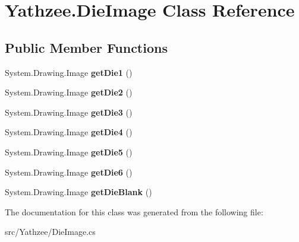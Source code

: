 \hypertarget{class_yathzee_1_1_die_image}{}\section{Yathzee.\+Die\+Image Class Reference}
\label{class_yathzee_1_1_die_image}
\subsection*{Public Member Functions}
\begin{DoxyCompactItemize}
\item 
System.\+Drawing.\+Image {\bfseries get\+Die1} ()\hypertarget{class_yathzee_1_1_die_image_a2724ca8f7897a55ffe997ef924394c7e}{}\label{class_yathzee_1_1_die_image_a2724ca8f7897a55ffe997ef924394c7e}

\item 
System.\+Drawing.\+Image {\bfseries get\+Die2} ()\hypertarget{class_yathzee_1_1_die_image_a263559c79673dcfaaed6e32611c52804}{}\label{class_yathzee_1_1_die_image_a263559c79673dcfaaed6e32611c52804}

\item 
System.\+Drawing.\+Image {\bfseries get\+Die3} ()\hypertarget{class_yathzee_1_1_die_image_ad1a3e766145e9b4866088a0774bfa30a}{}\label{class_yathzee_1_1_die_image_ad1a3e766145e9b4866088a0774bfa30a}

\item 
System.\+Drawing.\+Image {\bfseries get\+Die4} ()\hypertarget{class_yathzee_1_1_die_image_a413e19c90b843b4c1ea7a4b4eba824db}{}\label{class_yathzee_1_1_die_image_a413e19c90b843b4c1ea7a4b4eba824db}

\item 
System.\+Drawing.\+Image {\bfseries get\+Die5} ()\hypertarget{class_yathzee_1_1_die_image_a8195f245d22a93c8b57244fbb7721db2}{}\label{class_yathzee_1_1_die_image_a8195f245d22a93c8b57244fbb7721db2}

\item 
System.\+Drawing.\+Image {\bfseries get\+Die6} ()\hypertarget{class_yathzee_1_1_die_image_a320bc5d43dd0400443cfce5d81f57adb}{}\label{class_yathzee_1_1_die_image_a320bc5d43dd0400443cfce5d81f57adb}

\item 
System.\+Drawing.\+Image {\bfseries get\+Die\+Blank} ()\hypertarget{class_yathzee_1_1_die_image_a86d428cf3935a1785df461b2fa710d8f}{}\label{class_yathzee_1_1_die_image_a86d428cf3935a1785df461b2fa710d8f}

\end{DoxyCompactItemize}


The documentation for this class was generated from the following file\+:\begin{DoxyCompactItemize}
\item 
src/\+Yathzee/Die\+Image.\+cs\end{DoxyCompactItemize}
